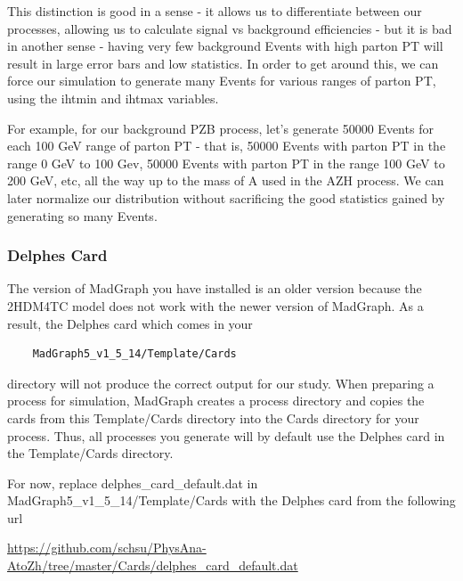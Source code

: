 \documentclass{article}
\begin{document}
\bigskip

This distinction is good in a sense - it allows us to differentiate between
our processes, allowing us to calculate signal vs background efficiencies - but it is bad in another sense - having very few background Events
with high parton PT will result in large error bars and low statistics. In order to get around this, we can force our simulation to generate
many Events for various ranges of parton PT, using the ihtmin and ihtmax variables.

\bigskip

For example, for our background PZB process, let's generate
50000 Events for each 100 GeV range of parton PT - that is, 50000 Events with parton PT in the range 0 GeV to 100 Gev, 50000 Events with parton
PT in the range 100 GeV to 200 GeV, etc, all the way up to the mass of A used in the AZH process. We can later normalize our distribution without
sacrificing the good statistics gained by generating so many Events.

\subsubsection{Delphes Card}

The version of MadGraph you have installed is an older version because the 2HDM4TC model does
not work with the newer version of MadGraph. As a result, the Delphes card which comes in your

\begin{verbatim}
	MadGraph5_v1_5_14/Template/Cards
\end{verbatim}

directory will not produce the correct output for our study. When preparing a process for
simulation, MadGraph creates a process directory and copies the cards from this Template/Cards
directory into the Cards directory for your process. Thus, all processes you generate will by
default use the Delphes card in the Template/Cards directory.

\bigskip

For now, replace delphes\_card\_default.dat in MadGraph5\_v1\_5\_14/Template/Cards with the Delphes card from the following url

\bigskip

\url{https://github.com/schsu/PhysAna-AtoZh/tree/master/Cards/delphes_card_default.dat}

\bigskip
\end{document}
